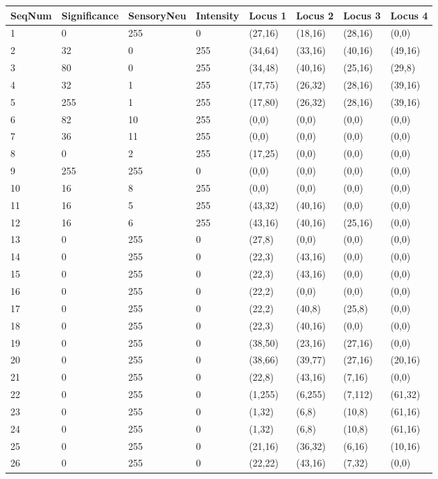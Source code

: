 \documentclass{article}
\begin{document}
\begin{longtable}{|p{2cm}|p{2cm}|p{2cm}|p{2cm}|p{1.50cm}|p{1.50cm}|p{1.50cm}|p{1.50cm}|}
\hline
{\bf SeqNum} & {\bf Significance} & {\bf SensoryNeu} & {\bf Intensity} & {\bf Locus 1} & {\bf Locus 2} & {\bf Locus 3} & {\bf Locus 4} \\ \hline
1 & 0 & 255 & 0 & (27,16) & (18,16) & (28,16) & (0,0) \\ \hline
2 & 32 & 0 & 255 & (34,64) & (33,16) & (40,16) & (49,16) \\ \hline
3 & 80 & 0 & 255 & (34,48) & (40,16) & (25,16) & (29,8) \\ \hline
4 & 32 & 1 & 255 & (17,75) & (26,32) & (28,16) & (39,16) \\ \hline
5 & 255 & 1 & 255 & (17,80) & (26,32) & (28,16) & (39,16) \\ \hline
6 & 82 & 10 & 255 & (0,0) & (0,0) & (0,0) & (0,0) \\ \hline
7 & 36 & 11 & 255 & (0,0) & (0,0) & (0,0) & (0,0) \\ \hline
8 & 0 & 2 & 255 & (17,25) & (0,0) & (0,0) & (0,0) \\ \hline
9 & 255 & 255 & 0 & (0,0) & (0,0) & (0,0) & (0,0) \\ \hline
10 & 16 & 8 & 255 & (0,0) & (0,0) & (0,0) & (0,0) \\ \hline
11 & 16 & 5 & 255 & (43,32) & (40,16) & (0,0) & (0,0) \\ \hline
12 & 16 & 6 & 255 & (43,16) & (40,16) & (25,16) & (0,0) \\ \hline
13 & 0 & 255 & 0 & (27,8) & (0,0) & (0,0) & (0,0) \\ \hline
14 & 0 & 255 & 0 & (22,3) & (43,16) & (0,0) & (0,0) \\ \hline
15 & 0 & 255 & 0 & (22,3) & (43,16) & (0,0) & (0,0) \\ \hline
16 & 0 & 255 & 0 & (22,2) & (0,0) & (0,0) & (0,0) \\ \hline
17 & 0 & 255 & 0 & (22,2) & (40,8) & (25,8) & (0,0) \\ \hline
18 & 0 & 255 & 0 & (22,3) & (40,16) & (0,0) & (0,0) \\ \hline
19 & 0 & 255 & 0 & (38,50) & (23,16) & (27,16) & (0,0) \\ \hline
20 & 0 & 255 & 0 & (38,66) & (39,77) & (27,16) & (20,16) \\ \hline
21 & 0 & 255 & 0 & (22,8) & (43,16) & (7,16) & (0,0) \\ \hline
22 & 0 & 255 & 0 & (1,255) & (6,255) & (7,112) & (61,32) \\ \hline
23 & 0 & 255 & 0 & (1,32) & (6,8) & (10,8) & (61,16) \\ \hline
24 & 0 & 255 & 0 & (1,32) & (6,8) & (10,8) & (61,16) \\ \hline
25 & 0 & 255 & 0 & (21,16) & (36,32) & (6,16) & (10,16) \\ \hline
26 & 0 & 255 & 0 & (22,22) & (43,16) & (7,32) & (0,0) \\ \hline
\end{longtable}
\end{document}
